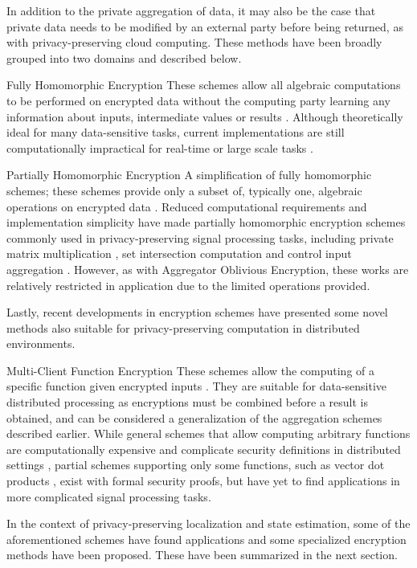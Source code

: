 \documentclass[10pt,letterpaper,oneside,twocolumn,journal]{IEEEtran}
\theoremstyle{definition}
\theoremstyle{definition}
\theoremstyle{remark}
\begin{document}
In addition to the private aggregation of data, it may also be the case that private data needs to be modified by an external party before being returned, as with privacy-preserving cloud computing. These methods have been broadly grouped into two domains and described below.
\begin{LaTeXdescription}
    \item[Fully Homomorphic Encryption] These schemes allow all algebraic computations to be performed on encrypted data without the computing party learning any information about inputs, intermediate values or results \cite{gentryFullyHomomorphicEncryption2009,stehleFasterFullyHomomorphic2010}. Although theoretically ideal for many data-sensitive tasks, current implementations are still computationally impractical for real-time or large scale tasks \cite{acarSurveyHomomorphicEncryption2018}.
    \item[Partially Homomorphic Encryption] A simplification of fully homomorphic schemes; these schemes provide only a subset of, typically one, algebraic operations on encrypted data \cite{elgamalPublicKeyCryptosystem1985,paillierPublicKeyCryptosystemsBased1999,bonehEvaluating2DNFFormulas2005}. Reduced computational requirements and implementation simplicity have made partially homomorphic encryption schemes commonly used in privacy-preserving signal processing tasks, including private matrix multiplication \cite{kogisoCyberSecurityEnhancementNetworked2015}, set intersection computation \cite{kerschbaumOutsourcedPrivateSet2012} and control input aggregation \cite{alexandruEncryptedCooperativeControl2019}. However, as with Aggregator Oblivious Encryption, these works are relatively restricted in application due to the limited operations provided.
\end{LaTeXdescription}
Lastly, recent developments in encryption schemes have presented some novel methods also suitable for privacy-preserving computation in distributed environments.
\begin{LaTeXdescription}
    \item[Multi-Client Function Encryption] These schemes allow the computing of a specific function given encrypted inputs \cite{bonehFunctionalEncryptionDefinitions2011,goldwasserMultiinputFunctionalEncryption2014}. They are suitable for data-sensitive distributed processing as encryptions must be combined before a result is obtained, and can be considered a generalization of the aggregation schemes described earlier. While general schemes that allow computing arbitrary functions are computationally expensive and complicate security definitions in distributed settings \cite{agrawalFunctionalEncryptionNew2013}, partial schemes supporting only some functions, such as vector dot products \cite{chotardDecentralizedMultiClientFunctional2018}, exist with formal security proofs, but have yet to find applications in more complicated signal processing tasks.
\end{LaTeXdescription}
In the context of privacy-preserving localization and state estimation, some of the aforementioned schemes have found applications and some specialized encryption methods have been proposed. These have been summarized in the next section.
\end{document}
